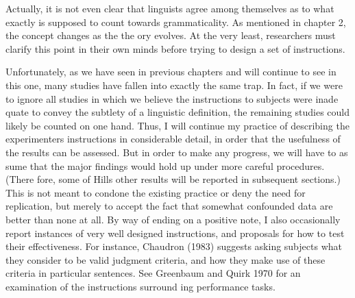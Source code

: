 \setcounter{listWWNumxxxiileveli}{5}
\begin{listWWNumxxxiileveli}
\item 
\begin{styleStandard}
Actually, it is not even clear that linguists agree among themselves as to what exactly is supposed to count towards grammaticality. As mentioned in chapter 2, the concept changes as the the\- ory evolves. At the very least, researchers must clarify this point in their own minds before trying to design a set of instructions.
\end{styleStandard}


\end{listWWNumxxxiileveli}
\clearpage\setcounter{page}{1}\begin{styleStandard}
Unfortunately, as we have seen in previous chapters and will continue to see in this one, many studies have fallen into exactly the same trap. In fact, if we were to ignore all studies in which we believe the instructions to subjects were inade\- quate to convey the subtlety of a linguistic definition, the remaining studies could likely be counted on one hand. Thus, I will continue my practice of describing the experimenter{\textquotesingle}s instructions in considerable detail, in order that the usefulness of the results can be assessed. But in order to make any progress, we will have to as\- sume that the major findings would hold up under more careful procedures. (There\- fore, some of Hill{\textquotesingle}s other results will be reported in subsequent sections.) This is not meant to condone the existing practice or deny the need for replication, but merely to accept the fact that somewhat confounded data are better than none at all. By way of ending on a positive note, I also occasionally report instances of very well designed instructions, and proposals for how to test their effectiveness. For instance, Chaudron (1983) suggests asking subjects what they consider to be valid judgment criteria, and how they make use of these criteria in particular sentences. See Greenbaum and Quirk 1970 for an examination of the instructions surround\- ing performance tasks.
\end{styleStandard}



